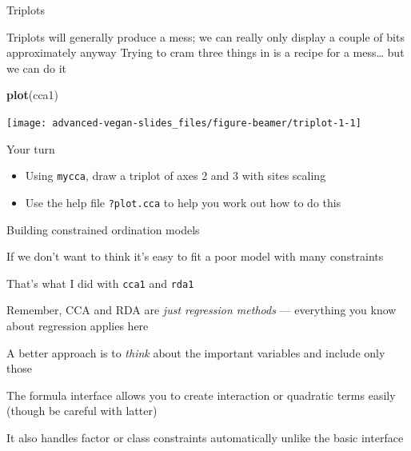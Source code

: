 \documentclass[10pt,ignorenonframetext,compress, aspectratio=169]{beamer}
\newenvironment{Shaded}{\begin{snugshade}}{\end{snugshade}}
\newcommand{\KeywordTok}[1]{\textcolor[rgb]{0.13,0.29,0.53}{\textbf{{#1}}}}
\newcommand{\NormalTok}[1]{{#1}}
\begin{document}
\begin{frame}[fragile]{Triplots}

Triplots will generally produce a mess; we can really only display a
couple of bits approximately anyway Trying to cram three things in is a
recipe for a mess\ldots{} but we can do it

\scriptsize

\begin{Shaded}
\begin{Highlighting}[]
\KeywordTok{plot}\NormalTok{(cca1)}
\end{Highlighting}
\end{Shaded}

\begin{center}\texttt{[image: advanced-vegan-slides\_files/figure-beamer/triplot-1-1]} \end{center}

\normalsize

\end{frame}

\begin{frame}{Your turn}

\begin{itemize}
\itemsep1pt\parskip0pt
\item
  Using \texttt{mycca}, draw a triplot of axes 2 and 3 with sites
  scaling
\item
  Use the help file \texttt{?plot.cca} to help you work out how to do
  this
\end{itemize}

\end{frame}

\begin{frame}{Building constrained ordination models}

If we don't want to think it's easy to fit a poor model with many
constraints

That's what I did with \texttt{cca1} and \texttt{rda1}

Remember, CCA and RDA are \emph{just regression methods} --- everything
you know about regression applies here

A better approach is to \emph{think} about the important variables and
include only those

The formula interface allows you to create interaction or quadratic
terms easily (though be careful with latter)

It also handles factor or class constraints automatically unlike the
basic interface

\end{frame}
\end{document}
